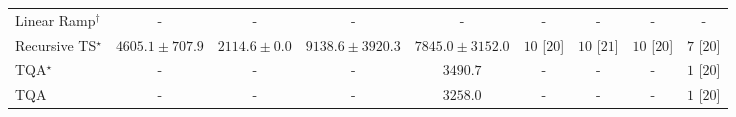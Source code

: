 \begin{tabular}{l|cccc|cccc|}
Linear Ramp$^\dagger$ & {\cellcolor[HTML]{000000}} \color[HTML]{F1F1F1} {\cellcolor{white}} \color{black} - & {\cellcolor[HTML]{000000}} \color[HTML]{F1F1F1} {\cellcolor{white}} \color{black} - & {\cellcolor[HTML]{000000}} \color[HTML]{F1F1F1} {\cellcolor{white}} \color{black} - & {\cellcolor[HTML]{000000}} \color[HTML]{F1F1F1} {\cellcolor{white}} \color{black} - & {\cellcolor[HTML]{000000}} \color[HTML]{F1F1F1} {\cellcolor{white}} \color{black} - & {\cellcolor[HTML]{000000}} \color[HTML]{F1F1F1} {\cellcolor{white}} \color{black} - & {\cellcolor[HTML]{000000}} \color[HTML]{F1F1F1} {\cellcolor{white}} \color{black} - & {\cellcolor[HTML]{000000}} \color[HTML]{F1F1F1} {\cellcolor{white}} \color{black} - \\
Recursive TS$^\star$ & {\cellcolor[HTML]{9EBAD9}} \color[HTML]{000000} $4605.1\pm 707.9$ & {\cellcolor[HTML]{F5EFF6}} \color[HTML]{000000} $2114.6\pm 0.0$ & {\cellcolor[HTML]{023858}} \color[HTML]{F1F1F1} $9138.6\pm 3920.3$ & {\cellcolor[HTML]{04629A}} \color[HTML]{F1F1F1} $7845.0\pm 3152.0$ & {\cellcolor[HTML]{49006A}} \color[HTML]{F1F1F1} $10$ [$20$] & {\cellcolor[HTML]{49006A}} \color[HTML]{F1F1F1} $10$ [$21$] & {\cellcolor[HTML]{49006A}} \color[HTML]{F1F1F1} $10$ [$20$] & {\cellcolor[HTML]{CD238F}} \color[HTML]{F1F1F1} $7$ [$20$] \\
TQA$^\star$ & {\cellcolor[HTML]{000000}} \color[HTML]{F1F1F1} {\cellcolor{white}} \color{black} - & {\cellcolor[HTML]{000000}} \color[HTML]{F1F1F1} {\cellcolor{white}} \color{black} - & {\cellcolor[HTML]{000000}} \color[HTML]{F1F1F1} {\cellcolor{white}} \color{black} - & {\cellcolor[HTML]{D1D2E6}} \color[HTML]{000000} $3490.7$ & {\cellcolor[HTML]{000000}} \color[HTML]{F1F1F1} {\cellcolor{white}} \color{black} - & {\cellcolor[HTML]{000000}} \color[HTML]{F1F1F1} {\cellcolor{white}} \color{black} - & {\cellcolor[HTML]{000000}} \color[HTML]{F1F1F1} {\cellcolor{white}} \color{black} - & {\cellcolor[HTML]{FFF7F3}} \color[HTML]{000000} $1$ [$20$] \\
TQA & {\cellcolor[HTML]{000000}} \color[HTML]{F1F1F1} {\cellcolor{white}} \color{black} - & {\cellcolor[HTML]{000000}} \color[HTML]{F1F1F1} {\cellcolor{white}} \color{black} - & {\cellcolor[HTML]{000000}} \color[HTML]{F1F1F1} {\cellcolor{white}} \color{black} - & {\cellcolor[HTML]{D8D7E9}} \color[HTML]{000000} $3258.0$ & {\cellcolor[HTML]{000000}} \color[HTML]{F1F1F1} {\cellcolor{white}} \color{black} - & {\cellcolor[HTML]{000000}} \color[HTML]{F1F1F1} {\cellcolor{white}} \color{black} - & {\cellcolor[HTML]{000000}} \color[HTML]{F1F1F1} {\cellcolor{white}} \color{black} - & {\cellcolor[HTML]{FFF7F3}} \color[HTML]{000000} $1$ [$20$] \\

\end{tabular}
